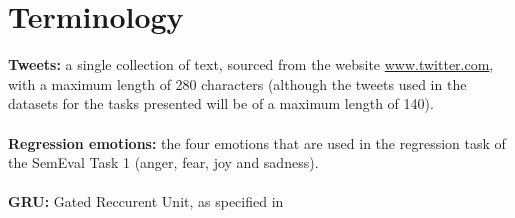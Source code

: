 
\section*{Terminology}

\textbf{Tweets:} a single collection of text, sourced from the website \href{www.twitter.com}{www.twitter.com}, with a maximum length of 280 characters (although the tweets used in the datasets for the tasks presented will be of a maximum length of 140).\\
\\
\textbf{Regression emotions:} the four emotions that are used in the regression task of the SemEval Task 1 (anger, fear, joy and sadness).\\
\\
\textbf{GRU:} Gated Reccurent Unit, as specified in \cite{chung}